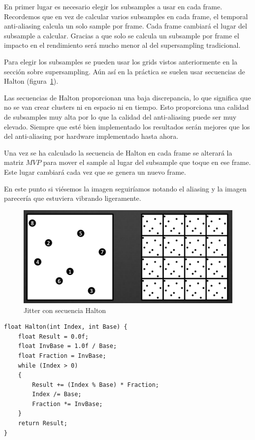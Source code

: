 \documentclass[withindex, glossary]{cam-thesis}
\begin{document}
En primer lugar es necesario elegir los subsamples a usar en cada frame. Recordemos que en vez de calcular varios subsamples en cada frame, el temporal anti-aliasing calcula un solo sample por frame. Cada frame cambiará el lugar del subsample a calcular. Gracias a que solo se calcula un subsample por frame el impacto en el rendimiento será mucho menor al del supersampling tradicional.

Para elegir los subsamples se pueden usar los grids vistos anteriormente en la sección sobre supersampling\cite{unrealtaa}. Aún así en la práctica se suelen usar secuencias de Halton (figura~\ref{halton}).

Las secuencias de Halton proporcionan una baja discrepancia, lo que significa que no se van crear clusters ni en espacio ni en tiempo. Esto proporciona una calidad de subsamples muy alta por lo que la calidad del anti-aliasing puede ser muy elevado. Siempre que esté bien implementado los resultados serán mejores que los del anti-aliasing por hardware implementado hasta ahora\cite{unrealtaa}.

Una vez se ha calculado la secuencia de Halton en cada frame se alterará la matriz $MVP$ para mover el sample al lugar del subsample que toque en ese frame. Este lugar cambiará cada vez que se genera un nuevo frame.

En este punto si viésemos la imagen seguiríamos notando el aliasing y la imagen parecería que estuviera vibrando ligeramente.

\begin{figure}[!htbp]
    \includegraphics[width=\linewidth]{figures/halton.png}
    \caption{Jitter con secuencia Halton\label{halton}}
\end{figure}

\begin{verbatim}
float Halton(int Index, int Base) {
    float Result = 0.0f;
    float InvBase = 1.0f / Base;
    float Fraction = InvBase;
    while (Index > 0)
    {
        Result += (Index % Base) * Fraction;
        Index /= Base;
        Fraction *= InvBase;
    }
    return Result;
}
\end{verbatim}
\end{document}
